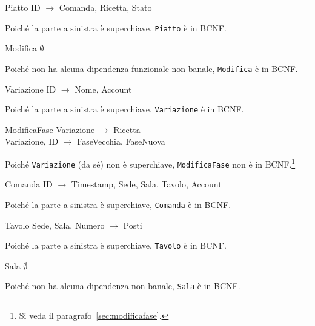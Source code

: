 \begin{samepage}
\begin{funcdep}{Piatto}
    ID $\to$ Comanda, Ricetta, Stato
\end{funcdep}
Poiché la parte a sinistra è superchiave, {\tt Piatto} è in BCNF.
\end{samepage}

\begin{samepage}
\begin{funcdep}{Modifica}
    $\emptyset$
\end{funcdep}
Poiché non ha alcuna dipendenza funzionale non banale, {\tt Modifica} è in BCNF.
\end{samepage}

\begin{samepage}
\begin{funcdep}{Variazione}
    ID $\to$ Nome, Account
\end{funcdep}
Poiché la parte a sinistra è superchiave, {\tt Variazione} è in BCNF.
\end{samepage}

\begin{samepage}
\begin{funcdep}{ModificaFase}
    Variazione $\to$ Ricetta\\
    Variazione, ID $\to$ FaseVecchia, FaseNuova
\end{funcdep}
Poiché {\tt Variazione} (da sé) non è superchiave, {\tt ModificaFase} non è in BCNF.\footnote{Si veda il paragrafo~\vref{sec:modificafase}.}
\end{samepage}

\begin{samepage}
\begin{funcdep}{Comanda}
    ID $\to$ Timestamp, Sede, Sala, Tavolo, Account
\end{funcdep}
Poiché la parte a sinistra è superchiave, {\tt Comanda} è in BCNF.
\end{samepage}

\begin{samepage}
\begin{funcdep}{Tavolo}
    Sede, Sala, Numero $\to$ Posti
\end{funcdep}
Poiché la parte a sinistra è superchiave, {\tt Tavolo} è in BCNF.
\end{samepage}

\begin{samepage}
\begin{funcdep}{Sala}
    $\emptyset$
\end{funcdep}
Poiché non ha alcuna dipendenza non banale, {\tt Sala} è in BCNF.
\end{samepage}

